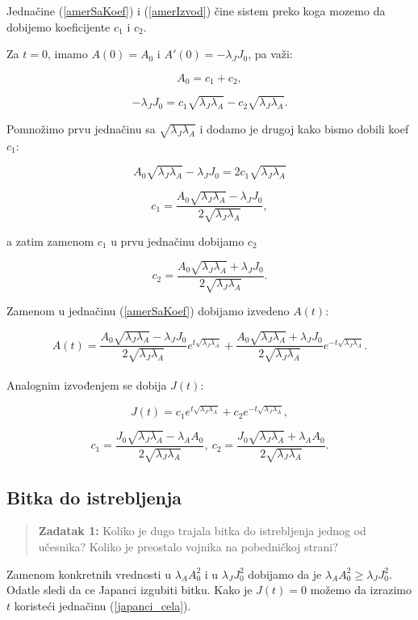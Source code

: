 \documentclass{article}
\newcommand{\laj}{\sqrt{\lambda_J\lambda_A}}
\begin{document}
Jednačine (\ref{amerSaKoef}) i (\ref{amerIzvod}) čine sistem preko koga mozemo
da dobijemo koeficijente \(c_1\) i \(c_2\). 

Za \(t = 0\), imamo  \(A(0) = A_0\) i
\(A'(0) = -\lambda_{J}J_0\), pa važi:

\[
  A_0 = c_1 + c_2,
\]

\[
  -\lambda_{J}J_0 = c_1 \laj - c_2 \laj.
\]

Pomnožimo prvu jednačinu sa \( \laj \) i dodamo je
drugoj kako bismo dobili koef \( c_1 \):

\[
  A_0 \laj - \lambda_{J}J_0 = 2 c_1 \laj
\]

\[
  c_1 = \frac{A_0 \laj - \lambda_J J_0}{2\laj },
\]

a zatim zamenom \(c_1\) u prvu jednačinu dobijamo \(c_2\)

\[
  c_2 = \frac{A_0 \laj + \lambda_J J_0}{2\laj }.
\]

Zamenom u jednačinu (\ref{amerSaKoef}) dobijamo izvedeno \(A(t)\):

\begin{equation}\label{ameri_cela}
  A(t) = \frac{A_0 \laj - \lambda_J J_0}{2 \laj } e^{t \laj } + \frac{A_0 \laj +
\lambda_J J_0}{2 \laj } e^{-t \laj}.
\end{equation}
\\
Analognim izvođenjem se dobija \(J(t)\):

\begin{equation}\label{japanci_cela}
  J(t) = c_1 e^{t \laj} + c_2 e^{-t \laj},
\end{equation}

\[
 c_1 = \frac{J_0 \laj- \lambda_A A_0}{2\laj},\ 
 c_2 = \frac{J_0 \laj+ \lambda_A A_0}{2 \laj}.
\]


\newpage

\subsection{Bitka do istrebljenja}

\vspace{5mm}
\begin{quote}
\textbf{Zadatak 1:}
Koliko je dugo trajala bitka do istrebljenja jednog od
učesnika? Koliko je preostalo vojnika na pobedničkoj
strani?
\end{quote}


\hspace{5mm}
Zamenom konkretnih vrednosti u \(\lambda_{A}A_0^2\) i u \(\lambda_{J}J_0^2\)
dobijamo da je \(\lambda_{A}A_0^2 \geq \lambda_{J}J_0^2\). Odatle sledi da ce
Japanci izgubiti bitku.
Kako je \(J(t) = 0\) možemo da izrazimo \(t\) koristeći jednačinu
(\ref{japanci_cela}).
\end{document}

